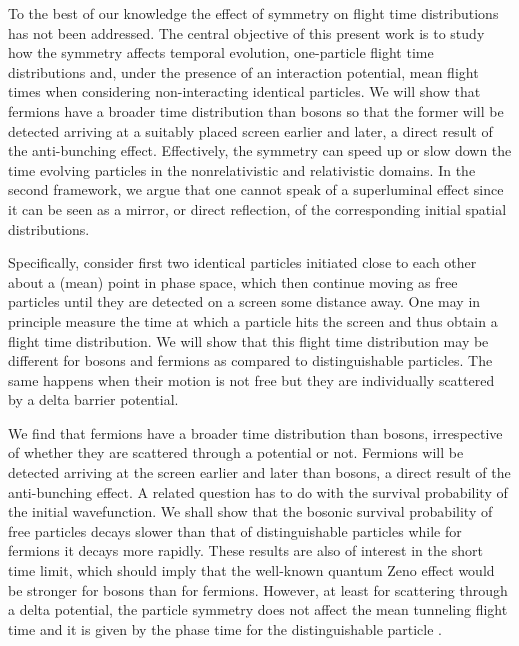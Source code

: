 \documentclass[preprint,aps]{revtex4}
\begin{document}
To the best of our knowledge the effect of symmetry on flight time
distributions \cite{petersen2017,petersen2018,rivlin2020,ianconescu2021} has
not been addressed. 
The central objective of this present work is to study how the symmetry affects temporal evolution, one-particle flight time distributions and, under the presence of an interaction potential, mean flight times when considering non-interacting identical particles. We will show that fermions have a
broader time distribution than bosons so that the former will be detected arriving at a suitably placed screen earlier and later, a direct result of the anti-bunching effect. 
Effectively, the symmetry can speed up or slow down the time evolving particles in the nonrelativistic and relativistic domains. In the second framework, we argue that one cannot speak of a superluminal effect since it can be seen as a mirror, or direct reflection, of the corresponding initial spatial distributions.

Specifically, consider first two identical particles initiated close to each other about a (mean) point in phase space, which then continue moving as free particles until they are detected on a screen some distance away. One may in principle measure the time at which a particle hits the screen
and thus obtain a flight time distribution. We will show that this flight time
distribution may be different for bosons and fermions as compared to
distinguishable particles. The same happens when their motion is not free but they
are individually scattered by a delta barrier potential.

We find  that fermions have a broader time distribution than bosons, irrespective of whether they are
scattered through a potential or not. Fermions will be detected arriving at
the screen earlier and later than bosons, a direct result of the anti-bunching effect.
A related question has to do with the survival probability of the initial
wavefunction. We shall show that the bosonic survival probability of free
particles decays slower than that of distinguishable particles while for fermions it decays more rapidly. These results are also of interest in the short time limit, which should imply that the well-known quantum Zeno effect \cite{Zeno1,Zeno2,Zeno3}
would be stronger for bosons than for fermions.
However, at least for scattering through a
delta potential, the particle symmetry does not affect the mean tunneling flight time and it is given by the phase time for the distinguishable particle \cite%
{rivlin2020,dumont2020}.
\end{document}
